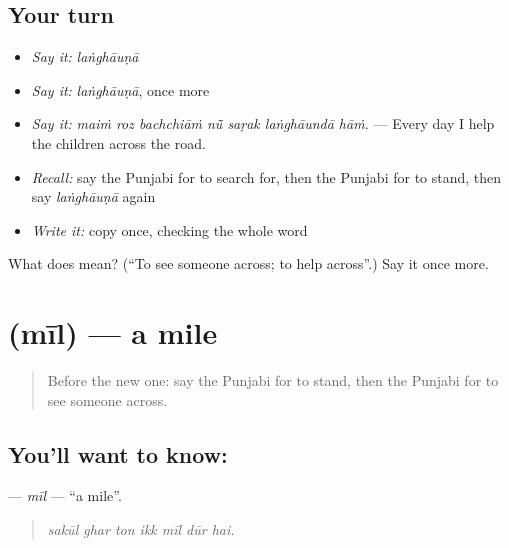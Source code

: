\subsection*{Your turn}
\begin{itemize}
\raggedright
  \item \emph{Say it:} \emph{laṅghāuṇā}
  \item \emph{Say it:} \emph{laṅghāuṇā}, once more
  \item \emph{Say it:} \emph{maiṁ roz bachchiāṁ nū̃ saṛak laṅghāundā hāṁ.} — Every day I help the children across the road.
  \item \emph{Recall:} say the Punjabi for to search for, then the Punjabi for to stand, then say \emph{laṅghāuṇā} again
  \item \emph{Write it:} copy \textbf{} once, checking the whole word
\end{itemize}

\begin{tcolorbox}[breakable,colback=teal!4,colframe=teal!35!black,title={Before you move on}]
What does  mean? (\textquotedblleft{}To see someone across; to help across\textquotedblright{}.) Say it once more.
\end{tcolorbox}
\section[\texorpdfstring{\pa{ਮੀਲ} (mīl)}{ਮੀਲ (mīl)}]{ (mīl) — a mile}

\label{lesson:PA-C270-mil}



\begin{quote}
Before the new one: say the Punjabi for to stand, then the Punjabi for to see someone across.
\end{quote}

\subsection*{You'll want to know: }
\textbf{} — \emph{mīl} — \textquotedblleft{}a mile\textquotedblright{}.

\begin{quote}
      
\end{quote}

\begin{quote}
\emph{sakūl ghar ton ikk mīl dūr hai.}
\end{quote}

